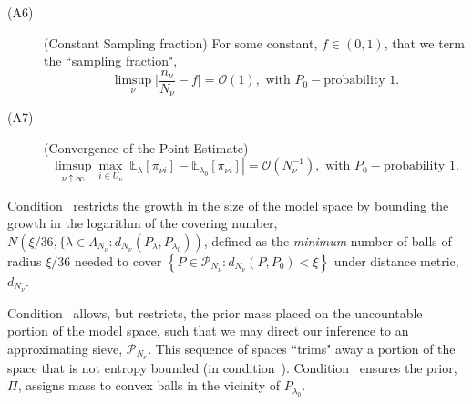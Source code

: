 \documentclass[]{imsart}
\newcommand{\order}[1]{\mathcal{O}(#1)}
\begin{document}
\begin{description}
\begin{equation*}
        \end{equation*}
\item[(A6)\label{fraction}] (Constant Sampling fraction)
        For some constant, $f \in(0,1)$, that we term the ``sampling fraction",
        \begin{equation*}
        \mathop{\limsup}_{\nu}\displaystyle\biggl\vert\frac{n_{\nu}}{N_{\nu}} - f\biggl\vert = \order{1}, \text{  with $P_{0}-$probability $1$.}
        \end{equation*}
\item[(A7)\label{pointconverge}] (Convergence of the Point Estimate)
        \begin{equation*}
         \displaystyle\mathop{\limsup}_{\nu\uparrow\infty} \mathop{\max}_{i \in U_{\nu}}\left\vert \mathbb{E}_{\lambda}\left[\pi_{\nu i}\right] - \mathbb{E}_{\lambda_{0}}\left[\pi_{\nu i}\right] \right\vert = \order{N_{\nu}^{-1}}, \text{  with $P_{0}-$probability $1$.}
        \end{equation*}
\end{description}
Condition~ restricts the growth in the size of the model space \citep{Ghosal00convergencerates} by bounding the growth in the logarithm of the covering number,
$N\left(\xi/36,\{\lambda\in\Lambda_{N_{\nu}}: d_{N_{\nu}}\left(P_{\lambda},P_{\lambda_{0}}\right)\right)$,
defined as the \emph{minimum} number of balls of radius $\xi/36$ needed to cover $\left\{P\in\mathcal{P}_{N_{\nu}}: d_{N_{\nu}}\left(P,P_{0}\right) < \xi\right\}$ under distance metric, $d_{N_{\nu}}$.
\begin{comment}
This condition guarantees the existence of test statistics,\\ $\phi_{n_{\nu}}\left(x_{1}\delta_{\nu 1},\ldots,x_{N_{\nu}}\delta_{\nu N_{\nu}}\right) \in\left(0,1\right)$, needed for enabling Lemma~\ref{numerator}, stated in the Supplementary Material, that bounds the expectation of the pseudo posterior mass assigned on the set $\{P\in \mathcal{P}_{N_{\nu}}:d_{n_{\nu}}\left(P,P_{0}\right) \geq \xi_{N_{\nu}}\}$.
\end{comment}
Condition~ allows, but restricts, the prior mass placed on the uncountable portion of the model space, such that we may direct our inference to an approximating sieve, $\mathcal{P}_{N_{\nu}}$.  This sequence of spaces ``trims" away a portion of the space that is not entropy bounded (in condition~).  Condition~ ensures the prior, $\Pi$, assigns mass to convex balls in the vicinity of $P_{\lambda_{0}}$.
\end{document}
